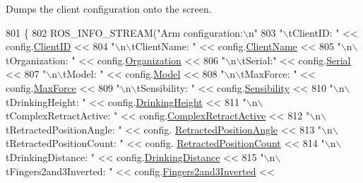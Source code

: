 Dumps the client configuration onto the screen. 


\begin{DoxyCode}
801 \{
802     ROS\_INFO\_STREAM(\textcolor{stringliteral}{"Arm configuration:\(\backslash\)n"}
803                     \textcolor{stringliteral}{"\(\backslash\)tClientID: "} << config.\hyperlink{KinovaTypes_8h_a2adccda7d27c7731ab0fe1160005e6ac}{ClientID} <<
804                     \textcolor{stringliteral}{"\(\backslash\)n\(\backslash\)tClientName: "} << config.\hyperlink{KinovaTypes_8h_a6ec42489c6a1e74a654809f5f39ca6f8}{ClientName} <<
805                     \textcolor{stringliteral}{"\(\backslash\)n\(\backslash\)tOrganization: "} << config.\hyperlink{KinovaTypes_8h_a55c82eb4163582b31c6d720766057767}{Organization} <<
806                     \textcolor{stringliteral}{"\(\backslash\)n\(\backslash\)tSerial:"} << config.\hyperlink{KinovaTypes_8h_adb0902769a42d7eaf9cce979d0779723}{Serial} <<
807                     \textcolor{stringliteral}{"\(\backslash\)n\(\backslash\)tModel: "} << config.\hyperlink{KinovaTypes_8h_a5bb86440679384635d0d0f41ca431249}{Model} <<
808                     \textcolor{stringliteral}{"\(\backslash\)n\(\backslash\)tMaxForce: "} << config.\hyperlink{KinovaTypes_8h_a9c68b6f56291d1be104928f7db071579}{MaxForce} <<
809                     \textcolor{stringliteral}{"\(\backslash\)n\(\backslash\)tSensibility: "} <<  config.\hyperlink{KinovaTypes_8h_a64e61dc032b95f127cd798a9759818d8}{Sensibility} <<
810                     \textcolor{stringliteral}{"\(\backslash\)n\(\backslash\)tDrinkingHeight: "} << config.\hyperlink{KinovaTypes_8h_a05043c8fe2f31f3c216a97edc2411664}{DrinkingHeight} <<
811                     \textcolor{stringliteral}{"\(\backslash\)n\(\backslash\)tComplexRetractActive: "} << config.\hyperlink{KinovaTypes_8h_aa41bf35ba1a1dd92f54a30814d42f795}{ComplexRetractActive} <<
812                     \textcolor{stringliteral}{"\(\backslash\)n\(\backslash\)tRetractedPositionAngle: "} << config.
      \hyperlink{KinovaTypes_8h_ad7d6245d4683b6e31d0438466ea6bb80}{RetractedPositionAngle} <<
813                     \textcolor{stringliteral}{"\(\backslash\)n\(\backslash\)tRetractedPositionCount: "} << config.
      \hyperlink{KinovaTypes_8h_a4058c290c5bac0504e511f0f50e5914b}{RetractedPositionCount} <<
814                     \textcolor{stringliteral}{"\(\backslash\)n\(\backslash\)tDrinkingDistance: "} << config.\hyperlink{KinovaTypes_8h_a494c5a866ae44191aafdc66ab69033c3}{DrinkingDistance} <<
815                     \textcolor{stringliteral}{"\(\backslash\)n\(\backslash\)tFingers2and3Inverted: "} << config.\hyperlink{KinovaTypes_8h_a55cb748c864cd65d8136da316b46df61}{Fingers2and3Inverted} <<

\end{DoxyCode}
